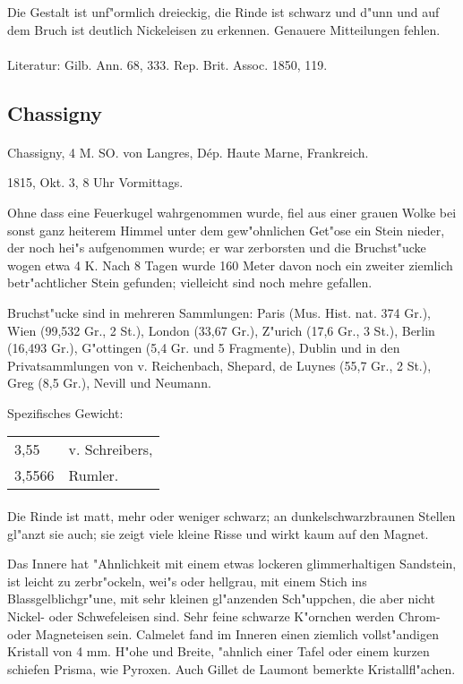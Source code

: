 \documentclass[a4paper, 11pt, oneside]{article}
\begin{document}
Die Gestalt ist unf"ormlich dreieckig, die Rinde ist schwarz und d"unn und auf dem Bruch ist deutlich Nickeleisen zu erkennen. Genauere Mitteilungen fehlen.
\footnotesize
\paragraph{}
Literatur: Gilb. Ann. 68, 333. Rep. Brit. Assoc. 1850, 119.
\subsection{Chassigny}
\normalsize
\paragraph{}
Chassigny, 4 M. SO. von Langres, Dép. Haute Marne, Frankreich.

1815, Okt. 3, 8 Uhr Vormittags.

Ohne dass eine Feuerkugel wahrgenommen wurde, fiel aus einer grauen Wolke bei sonst ganz heiterem Himmel unter dem gew"ohnlichen Get"ose ein Stein nieder, der noch hei"s aufgenommen wurde; er war zerborsten und die Bruchst"ucke wogen etwa 4 K. Nach 8 Tagen wurde 160 Meter davon noch ein zweiter ziemlich betr"achtlicher Stein gefunden; vielleicht sind noch mehre gefallen.

Bruchst"ucke sind in mehreren Sammlungen: Paris (Mus. Hist. nat. 374 Gr.), Wien (99,532 Gr., 2 St.), London (33,67 Gr.), Z"urich (17,6 Gr., 3 St.), Berlin (16,493 Gr.), G"ottingen (5,4 Gr. und 5 Fragmente), Dublin und in den Privatsammlungen von v. Reichenbach, Shepard, de Luynes (55,7 Gr., 2 St.), Greg (8,5 Gr.), Nevill und Neumann.

Spezifisches Gewicht:
\begin{table}[!ht]
    \centering
    \begin{tabular}{l l}
        3,55 & v. Schreibers,\\
        3,5566 & Rumler.
    \end{tabular}
\end{table}
\paragraph{}
Die Rinde ist matt, mehr oder weniger schwarz; an dunkelschwarzbraunen Stellen gl"anzt sie auch; sie zeigt viele kleine Risse und wirkt kaum auf den Magnet.

Das Innere hat "Ahnlichkeit mit einem etwas lockeren glimmerhaltigen Sandstein, ist leicht zu zerbr"ockeln, wei"s oder hellgrau, mit einem Stich ins Blassgelblichgr"une, mit sehr kleinen gl"anzenden Sch"uppchen, die aber nicht Nickel- oder Schwefeleisen sind. Sehr feine schwarze K"ornchen werden Chrom- oder Magneteisen sein. Calmelet fand im Inneren einen ziemlich vollst"andigen Kristall von 4 mm. H"ohe und Breite, "ahnlich einer Tafel oder einem kurzen schiefen Prisma, wie Pyroxen. Auch Gillet de Laumont bemerkte Kristallfl"achen.
\end{document}
